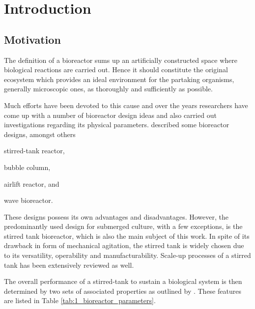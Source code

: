 \chapter{Introduction} \label{ch:introduction}

\section{Motivation}
The definition of a bioreactor sums up an artificially constructed space where biological reactions are carried out. Hence it should constitute the original ecosystem which provides an ideal environment for the partaking organisms, generally microscopic ones, as thoroughly and sufficiently as possible.

Much efforts have been devoted to this cause and over the years researchers have come up with a number of bioreactor design ideas and also carried out investigations regarding its physical parameters. \citet{mandenius2016challenges} described some bioreactor designs, amongst others \begin{inlineenum}
    \item stirred-tank reactor,
    \item bubble column,
    \item airlift reactor, and
    \item wave bioreactor.
\end{inlineenum} These designs possess its own advantages and disadvantages. However, the predominantly used design for submerged culture, with a few exceptions, is the stirred tank bioreactor, which is also the main subject of this work. In spite of its drawback in form of mechanical agitation, the stirred tank is widely chosen due to its versatility, operability and manufacturability. Scale-up processes of a stirred tank has been extensively reviewed as well.

The overall performance of a stirred-tank to sustain a biological system is then determined by two sets of associated properties as outlined by \citet{nienow1998hydrodynamics}. These features are listed in Table \ref{tab:1_bioreactor_parameters}.

